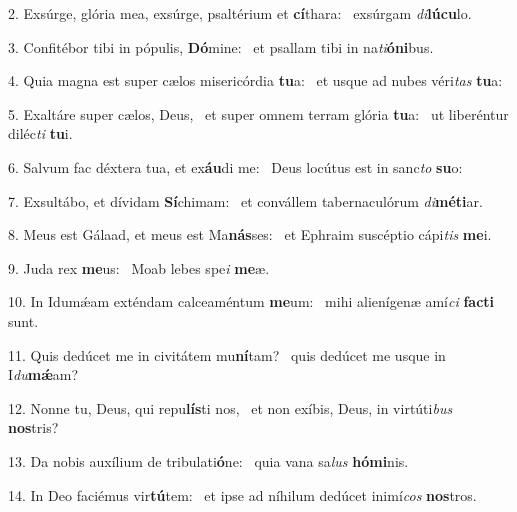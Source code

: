 2. Exsúrge, glória mea, exsúrge, psaltérium et \textbf{cí}thara: \ast\  exsúrgam \textit{di}\textbf{lú}\textbf{cu}lo.\

3. Confitébor tibi in pópulis, \textbf{Dó}mine: \ast\  et psallam tibi in na\textit{ti}\textbf{ó}\textbf{ni}bus.\

4. Quia magna est super cælos misericórdia \textbf{tu}a: \ast\  et usque ad nubes véri\textit{tas} \textbf{tu}a:\

5. Exaltáre super cælos, Deus, \dag\  et super omnem terram glória \textbf{tu}a: \ast\  ut liberéntur diléc\textit{ti} \textbf{tu}i.\

6. Salvum fac déxtera tua, et ex\textbf{áu}di me: \ast\  Deus locútus est in sanc\textit{to} \textbf{su}o:\

7. Exsultábo, et dívidam \textbf{Sí}chimam: \ast\  et convállem tabernaculórum \textit{di}\textbf{mé}\textbf{ti}ar.\

8. Meus est Gálaad, et meus est Ma\textbf{nás}ses: \ast\  et Ephraim suscéptio cápi\textit{tis} \textbf{me}i.\

9. Juda rex \textbf{me}us: \ast\  Moab lebes spe\textit{i} \textbf{me}æ.\

10. In Idumǽam exténdam calceaméntum \textbf{me}um: \ast\  mihi alienígenæ amí\textit{ci} \textbf{fac}\textbf{ti} sunt.\

11. Quis dedúcet me in civitátem mu\textbf{ní}tam? \ast\  quis dedúcet me usque in I\textit{du}\textbf{mǽ}am?\

12. Nonne tu, Deus, qui repu\textbf{lís}ti nos, \ast\  et non exíbis, Deus, in virtúti\textit{bus} \textbf{nos}tris?\

13. Da nobis auxílium de tribulati\textbf{ó}ne: \ast\  quia vana sa\textit{lus} \textbf{hó}\textbf{mi}nis.\

14. In Deo faciémus vir\textbf{tú}tem: \ast\  et ipse ad níhilum dedúcet inimí\textit{cos} \textbf{nos}tros.\

